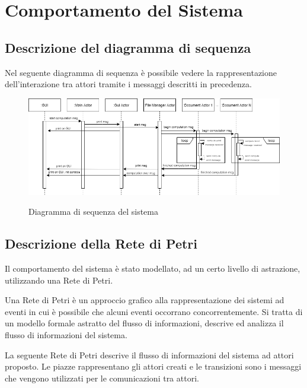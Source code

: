\section{Comportamento del Sistema}

\subsection{Descrizione del diagramma di sequenza} \label{SD-part1}

Nel seguente diagramma di sequenza è possibile vedere la rappresentazione dell'interazione tra attori tramite i messaggi descritti in precedenza.\newline

\begin{figure}[H]
	\begin{center}
		\includegraphics[width=1.1\linewidth]{img/part-1/document_actors_sequence.png}
		\label{fig:actors-seq-diagram}
	\end{center}
	\caption{Diagramma di sequenza del sistema}
\end{figure}

\subsection{Descrizione della Rete di Petri} \label{PN-part1}
Il comportamento del sistema è stato modellato, ad un certo livello di astrazione, utilizzando una Rete di Petri.
\begin{question}
Una Rete di Petri è un approccio grafico alla rappresentazione dei sistemi ad eventi in cui è possibile che alcuni eventi occorrano concorrentemente. Si tratta di un modello formale astratto del flusso di informazioni, descrive ed analizza il flusso di informazioni del sistema.
\end{question}

\noindent La seguente Rete di Petri descrive il flusso di informazioni del sistema ad attori proposto.\newline
Le piazze rappresentano gli attori creati e le transizioni sono i messaggi che vengono utilizzati per le comunicazioni tra attori.\newline

